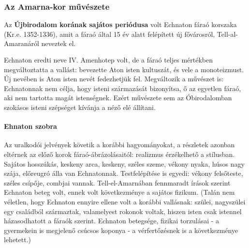 \subsubsection*{Az Amarna-kor művészete}

\begin{figure}
	\begin{minipage}{0.27\textwidth}
	\end{minipage}
	\begin{minipage}{0.27\textwidth}
	\end{minipage}
\end{figure} 

Az \textbf{Újbirodalom korának sajátos periódusa} volt Echnaton fáraó korszaka (Kr.e. 1352-1336), amit a fáraó által 15 év alatt felépített új fővárosról, Tell-al-Amaranáról neveztek el.

Echnaton eredti neve IV. Amenhotep volt, de a fáraó teljes mértékben megváltoztatta a vallást: bevezette Aton isten kultuszát, és vele a monoteizmust. Új nevében is Aton isten nevét fedezhetjük fel.
Megváltozik a művészet is: Echnatonnak nem célja, hogy isteni származását bizonyítsa, ő az egyetlen fáraó, aki nem tartotta magát istenségnek. Ezért művészete sem az Óbirodalomban szokásos isteni szépséget kívánja a néző elé állítani.

\paragraph{Ehnaton szobra}
Az uralkodói jelvények követik a korábbi hagyományokat, a részletek azonban eltérnek az előző korok fáraó-ábrázolásaitól: realizmus érzékelhető a stílusban. Sajátos hosszúkás, keskeny arca, keskeny, széles szeme, vékony nyaka, húsos nagy szája, előreugró álla van Echnatonnak. Testfelépítése is egyedi: vékony felsőteste, széles csípője, combjai vannak. Tell-el-Amarnában fennmaradt írások szerint Echnaton beteg volt, ennek volt következménye a sajátos fizikum. (Talán nem véletlen, hogy Echnaton ennyire ellene volt a korábbi vallásnak: szülei, nagyszülei egy családból származtak, valamelyest rokonok voltak, hiszen isten csak istennel házasodhatott a fáraók szerint. Echnaton betegsége, fizikai torzulásai - a gyermekein is megjelenő csúcsos koponya - a vérfertőzésnek is a következménye lehetett.)

